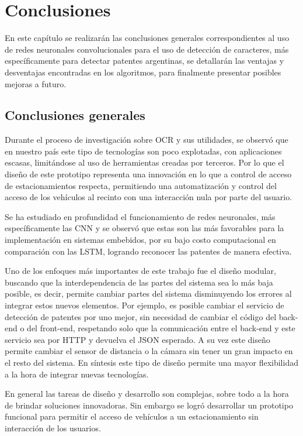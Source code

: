 \chapter{Conclusiones}
En este capítulo se realizarán las conclusiones generales correspondientes al uso de redes neuronales convolucionales para el uso de detección de caracteres, más específicamente para detectar patentes argentinas, se detallarán las ventajas y desventajas encontradas en los algoritmos, para finalmente presentar posibles mejoras a futuro.

\section{Conclusiones generales}

Durante el proceso de investigación sobre OCR y sus utilidades, se observó que en nuestro país este tipo de tecnologías son poco explotadas, con aplicaciones escasas, limitándose al uso de herramientas creadas por terceros.
Por lo que el diseño de este prototipo representa una innovación en lo que a control de acceso de estacionamientos respecta, permitiendo una automatización y control del acceso de los vehículos al recinto con una interacción nula por parte del usuario.

Se ha estudiado en profundidad el funcionamiento de redes neuronales, más específicamente las CNN y se observó que estas son las más favorables para la implementación en sistemas embebidos, por su bajo costo computacional en comparación con las LSTM, logrando reconocer las patentes de manera efectiva.

Uno de los enfoques más importantes de este trabajo fue el diseño modular, buscando que la interdependencia de las partes del sistema sea lo más baja posible, es decir, permite cambiar partes del sistema disminuyendo los errores al integrar estos nuevos elementos.
Por ejemplo, es posible cambiar el servicio de detección de patentes por uno mejor, sin necesidad de cambiar el código del back-end o del front-end, respetando solo que la comunicación entre el back-end y este servicio sea por HTTP y devuelva el JSON esperado.
A su vez este diseño permite cambiar el sensor de distancia o la cámara sin tener un gran impacto en el resto del sistema.
En síntesis este tipo de diseño permite una mayor flexibilidad a la hora de integrar nuevas tecnologías.

En general las tareas de diseño y desarrollo son complejas, sobre todo a la hora de brindar soluciones innovadoras.
Sin embargo se logró desarrollar un prototipo funcional para permitir el acceso de vehículos a un estacionamiento sin interacción de los usuarios.

